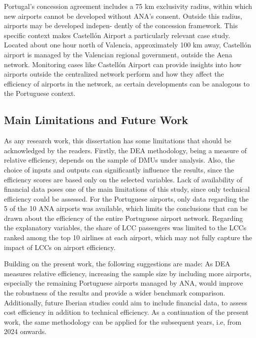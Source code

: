 Portugal’s concession agreement includes a 75 km exclusivity radius, within which new airports
cannot be developed without ANA’s consent. Outside this radius, airports may be developed indepen-
dently of the concession framework.
This specific context makes Castellón Airport a particularly relevant case study. Located about one
hour north of Valencia, approximately 100 km away, Castellón airport is managed by the Valencian
regional government, outside the Aena network. Monitoring cases like Castellón Airport can provide insights
into how airports outside the centralized network perform and how they affect
the efficiency of airports in the network, as certain developments can be analogous to the Portuguese
context.

\subsection{Main Limitations and Future Work}
As any research work, this dissertation has some limitations that should be acknowledged by the
readers. Firstly, the DEA methodology, being a measure of relative efficiency, depends on the sample
of DMUs under analysis. Also, the choice of inputs and outputs can significantly influence the results,
since the efficiency scores are based only on the selected variables. Lack of availability of financial
data poses one of the main limitations of this study, since only technical efficiency could be assessed. For the Portuguese airports, only data regarding the 5 of the 10 ANA airports was
available, which limits the conclusions that can be drawn about the efficiency of the entire Portuguese
airport network. Regarding the explanatory variables, the share of LCC passengers was limited to the LCCs ranked
among the top 10 airlines at each airport, which may not fully capture the impact of LCCs on airport
efficiency.

Building on the present work, the following suggestions are made: As DEA measures relative efficiency, increasing the sample size by including more airports, especially the remaining Portuguese airports managed by ANA, would improve the robustness of the results and provide a wider benchmark comparison. Additionally, future Iberian studies could aim to include financial data, to assess cost
efficiency in addition to technical efficiency. As a continuation of the present work, the same methodology can be applied for the subsequent
years, i.e, from 2024 onwards.